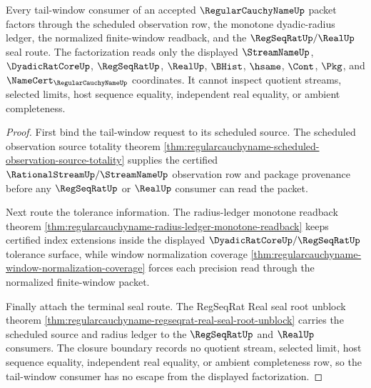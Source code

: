 \begin{theorem}
\label{thm:regularcauchyname-tail-window-consumer-factorization}
Every tail-window consumer of an accepted $\RegularCauchyNameUp$ packet factors through the scheduled observation row, the monotone dyadic-radius ledger, the normalized finite-window readback, and the $\RegSeqRatUp/\RealUp$ seal route. The factorization reads only the displayed $\StreamNameUp$, $\DyadicRatCoreUp$, $\RegSeqRatUp$, $\RealUp$, $\BHist$, $\hsame$, $\Cont$, $\Pkg$, and $\NameCert_{\RegularCauchyNameUp}$ coordinates. It cannot inspect quotient streams, selected limits, host sequence equality, independent real equality, or ambient completeness.
\end{theorem}
\begin{proof}
First bind the tail-window request to its scheduled source. The scheduled observation source totality theorem \autoref{thm:regularcauchyname-scheduled-observation-source-totality} supplies the certified $\RationalStreamUp/\StreamNameUp$ observation row and package provenance before any $\RegSeqRatUp$ or $\RealUp$ consumer can read the packet.

Next route the tolerance information. The radius-ledger monotone readback theorem \autoref{thm:regularcauchyname-radius-ledger-monotone-readback} keeps certified index extensions inside the displayed $\DyadicRatCoreUp/\RegSeqRatUp$ tolerance surface, while window normalization coverage \autoref{thm:regularcauchyname-window-normalization-coverage} forces each precision read through the normalized finite-window packet.

Finally attach the terminal seal route. The RegSeqRat Real seal root unblock theorem \autoref{thm:regularcauchyname-regseqrat-real-seal-root-unblock} carries the scheduled source and radius ledger to the $\RegSeqRatUp$ and $\RealUp$ consumers. The closure boundary records no quotient stream, selected limit, host sequence equality, independent real equality, or ambient completeness row, so the tail-window consumer has no escape from the displayed factorization.
\end{proof}

